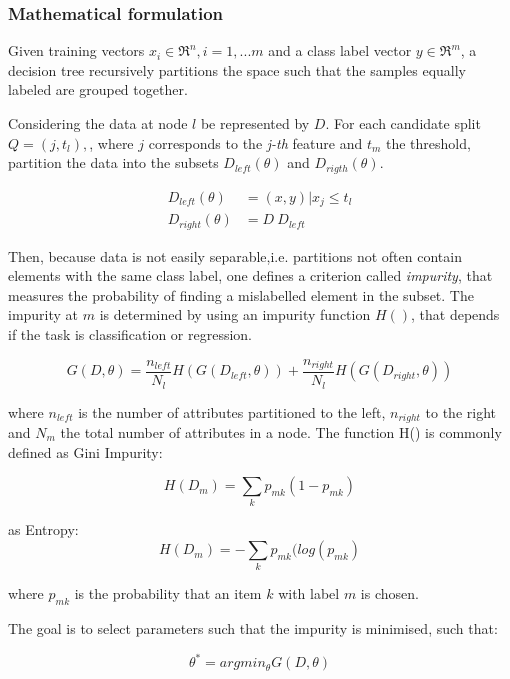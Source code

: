 \subsubsection{Mathematical formulation}

Given training vectors $x_i \in \Re^n, i = {1 , ... m} $ and a class label vector $y \in \Re^m$, a decision tree recursively partitions the space such that the samples equally labeled are grouped together. 

Considering the data at node $l$ be represented by $D$. For each candidate split $Q= (j, t_l),$, where $j$ corresponds to the \textit{j-th} feature and $t_m$ the threshold, partition the data into the subsets $D_{left}(\theta)$ and $D_{rigth}(\theta) $.

\begin{align}
D_{left}(\theta) &= (x,y) | x_j \le t_l \\
D_{right}(\theta) &= D \ D_{left}
\end{align}

Then, because data is not easily separable,i.e. partitions not often contain elements with the same class label, one defines a criterion called \textit{impurity}, that measures the probability of finding a mislabelled element in the subset. The impurity at $m$ is determined by using an impurity function $H()$, that depends if the task is classification or regression. 

\begin{equation}
G(D,\theta) = \frac{n_{left}}{N_l}H(G(D_{left},\theta)) + \frac{n_{right}}{N_l}H(G(D_{right},\theta)) 
\end{equation}

where $n_{left}$ is the number of attributes partitioned to the left, $n_{right}$ to the right and $N_m$ the total number of attributes in a node. The function H() is commonly defined as Gini Impurity: 

\begin{equation}
	H(D_m) = \sum_k p_{mk}(1-p_{mk})
\end{equation}

as Entropy:
\begin{equation}
H(D_m) = -\sum_k p_{mk}(log(p_{mk})
\end{equation}

where $p_{mk}$ is the probability that an item $k$ with label $m$ is chosen.

The goal is to select parameters such that the impurity is minimised, such that:

\begin{equation}
\theta^* = argmin_{\theta}  G(D, \theta)
\end{equation} 

